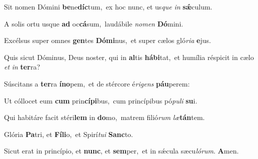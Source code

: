\setcounter{versecount}{2}

\vs Sit nomen Dómini \textbf{be}ne\textbf{díc}tum,~\redgreheightstar ex hoc nunc, et us\textit{que} \textit{in} \textbf{sǽ}culum.

\vs A solis ortu usque \textbf{ad} oc\textbf{cá}sum,~\redgreheightstar laudábile \textit{no}\textit{men} \textbf{Dó}mini.

\vs Excélsus super omnes \textbf{gen}tes \textbf{Dó}\textbf{mi}nus,~\redgreheightstar et super cælos gló\textit{ri}\textit{a} \textbf{e}jus.

\vs Quis sicut Dóminus, Deus noster, qui in \textbf{al}tis \textbf{há}\textbf{bi}tat,~\redgreheightstar et humília réspicit in cælo \textit{et} \textit{in} \textbf{ter}ra?

\vs Súscitans a \textbf{ter}ra \textbf{ín}\textbf{o}pem,~\redgreheightstar et de stércore é\textit{ri}\textit{gens} \textbf{páu}perem:

\vs Ut cóllocet eum \textbf{cum} prin\textbf{cí}\textbf{pi}bus,~\redgreheightstar cum princípibus pó\textit{pu}\textit{li} \textbf{su}i.

\vs Qui habitáre facit stéri\textbf{lem} in \textbf{do}mo,~\redgreheightstar matrem filió\textit{rum} \textit{læ}\textbf{tán}tem.

\vs Glória \textbf{Pa}tri, et \textbf{Fí}\textbf{li}o,~\redgreheightstar et Spirí\textit{tu}\textit{i} \textbf{Sanc}to.

\vs Sicut erat in princípio, et \textbf{nunc}, et \textbf{sem}per,~\redgreheightstar et in sǽcula sæcu\textit{ló}\textit{rum}. \textbf{A}men.

